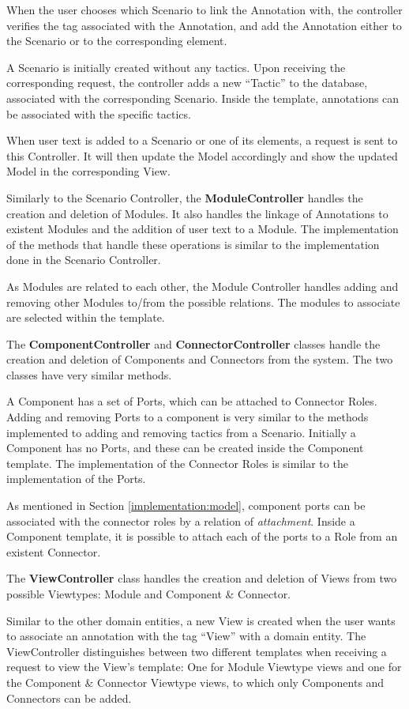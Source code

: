 \documentclass{llncs}
\begin{document}
When the user chooses which Scenario to link the Annotation with, the controller verifies the tag associated with the Annotation, and add the Annotation either to the Scenario or to the corresponding element. 

A Scenario is initially created without any tactics. Upon receiving the corresponding request, the controller adds a new ``Tactic'' to the database, associated with the corresponding Scenario. Inside the template, annotations can be associated with the specific tactics. 

When user text is added to a Scenario or one of its elements, a request is sent to this Controller. It will then update the Model accordingly and show the updated Model in the corresponding View.

Similarly to the Scenario Controller, the \textbf{ModuleController} handles the creation and deletion of Modules. It also handles the linkage of Annotations to existent Modules and the addition of user text to a Module. The implementation of the methods that handle these operations is similar to the implementation done in the Scenario Controller.

As Modules are related to each other, the Module Controller handles adding and removing other Modules to/from the possible relations. The modules to associate are selected within the template. 

The \textbf{ComponentController} and \textbf{ConnectorController} classes handle the creation and deletion of Components and Connectors from the system. The two classes have very similar methods.

A Component has a set of Ports, which can be attached to Connector Roles. Adding and removing Ports to a component is very similar to the methods implemented to adding and removing tactics from a Scenario. Initially a Component has no Ports, and these can be created inside the Component template. The implementation of the Connector Roles is similar to the implementation of the Ports.

As mentioned in Section \ref{implementation:model}, component ports can be associated with the connector roles by a relation of \textit{attachment}. Inside a Component template, it is possible to attach each of the ports to a Role from an existent Connector.

The \textbf{ViewController} class handles the creation and deletion of Views from two possible Viewtypes: Module and Component \& Connector. 

Similar to the other domain entities, a new View is created when the user wants to associate an annotation with the tag ``View'' with a domain entity.
The ViewController distinguishes between two different templates when receiving a request to view the View's template: One for Module Viewtype views and one for the Component \& Connector Viewtype views, to which only Components and Connectors can be added.
 
\end{document}

